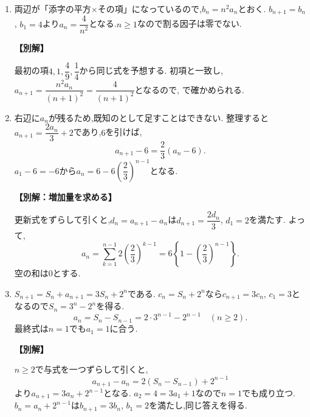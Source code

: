 \begin{enumerate}[label=\textbf{問\arabic*.},leftmargin=3.8em,format=\bookitemlink{practice-basic}{solution}{problem}]
          \item 両辺が「添字の平方×その項」になっているので,$b_n=n^2a_n$とおく.
                  $b_{n+1}=b_n$, $b_1=4$より$a_n=\dfrac{4}{n^2}$となる.$n\ge1$なので割る因子は零でない.
                  \par\smallskip\noindent\textbf{【別解】}\par
                  最初の項$4,1,\dfrac{4}{9},\dfrac{1}{4}$から同じ式を予想する.
                  初項と一致し,$a_{n+1}=\dfrac{n^2a_n}{(n+1)^2}=\dfrac{4}{(n+1)^2}$となるので,
                  で確かめられる.

          \item 右辺に$a_n$が残るため,既知のとして足すことはできない.
                  整理すると$a_{n+1}=\dfrac{2a_n}{3}+2$であり,$6$を引けば,
                  \[
                    a_{n+1}-6=\frac23(a_n-6).
                  \]
                  $a_1-6=-6$から$a_n=6-6\left(\dfrac{2}{3}\right)^{n-1}$となる.
                  \par\smallskip\noindent\textbf{【別解：増加量を求める】}\par
                  更新式をずらして引くと,$d_n=a_{n+1}-a_n$は$d_{n+1}=\dfrac{2d_n}{3}$, $d_1=2$を満たす.
                  よって,
                  \[
                    a_n=\sum_{k=1}^{n-1}2\left(\frac23\right)^{k-1}
                       =6\left\{1-\left(\frac23\right)^{n-1}\right\}.
                  \]
                  空の和は$0$とする.

          \item $S_{n+1}=S_n+a_{n+1}=3S_n+2^n$である.
                  $c_n=S_n+2^n$なら$c_{n+1}=3c_n$, $c_1=3$となるので$S_n=3^n-2^n$を得る.
                  \[
                    a_n=S_n-S_{n-1}=2\cdot3^{n-1}-2^{n-1}
                    \quad(n\ge2).
                  \]
                  最終式は$n=1$でも$a_1=1$に合う.
                  \par\smallskip\noindent\textbf{【別解】}\par
                  $n\ge2$で与式を一つずらして引くと,
                  \[
                    a_{n+1}-a_n=2(S_n-S_{n-1})+2^{n-1}
                  \]
                  より$a_{n+1}=3a_n+2^{n-1}$となる.
                  $a_2=4=3a_1+1$なので$n=1$でも成り立つ.
                  $b_n=a_n+2^{n-1}$は$b_{n+1}=3b_n$, $b_1=2$を満たし,同じ答えを得る.


\end{enumerate}
